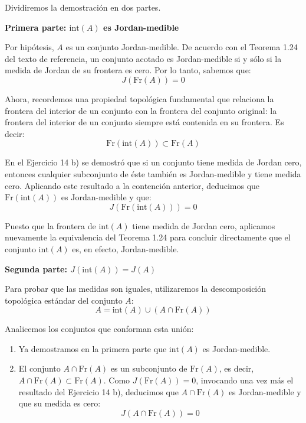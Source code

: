 \documentclass[11pt,letterpaper]{article}
\begin{document}
Dividiremos la demostración en dos partes.

\vspace{0.5cm}
\textbf{Primera parte: $\text{int}(A)$ es Jordan-medible}

Por hipótesis, $A$ es un conjunto Jordan-medible. De acuerdo con el Teorema 1.24 del texto de referencia, un conjunto acotado es Jordan-medible si y sólo si la medida de Jordan de su frontera es cero. Por lo tanto, sabemos que:
\begin{equation*}
J(\text{Fr}(A)) = 0
\end{equation*}

Ahora, recordemos una propiedad topológica fundamental que relaciona la frontera del interior de un conjunto con la frontera del conjunto original: la frontera del interior de un conjunto siempre está contenida en su frontera. Es decir:
\begin{equation*}
\text{Fr}(\text{int}(A)) \subset \text{Fr}(A)
\end{equation*}

En el Ejercicio 14 b) se demostró que si un conjunto tiene medida de Jordan cero, entonces cualquier subconjunto de éste también es Jordan-medible y tiene medida cero. Aplicando este resultado a la contención anterior, deducimos que $\text{Fr}(\text{int}(A))$ es Jordan-medible y que:
\begin{equation*}
J(\text{Fr}(\text{int}(A))) = 0
\end{equation*}

Puesto que la frontera de $\text{int}(A)$ tiene medida de Jordan cero, aplicamos nuevamente la equivalencia del Teorema 1.24 para concluir directamente que el conjunto $\text{int}(A)$ es, en efecto, Jordan-medible.

\vspace{0.5cm}
\textbf{Segunda parte: $J(\text{int}(A)) = J(A)$}

Para probar que las medidas son iguales, utilizaremos la descomposición topológica estándar del conjunto $A$:
\begin{equation*}
A = \text{int}(A) \cup (A \cap \text{Fr}(A))
\end{equation*}

Analicemos los conjuntos que conforman esta unión:
\begin{enumerate}
    \item Ya demostramos en la primera parte que $\text{int}(A)$ es Jordan-medible.
    \item El conjunto $A \cap \text{Fr}(A)$ es un subconjunto de $\text{Fr}(A)$, es decir, $A \cap \text{Fr}(A) \subset \text{Fr}(A)$. Como $J(\text{Fr}(A)) = 0$, invocando una vez más el resultado del Ejercicio 14 b), deducimos que $A \cap \text{Fr}(A)$ es Jordan-medible y que su medida es cero:
    \begin{equation*}
    J(A \cap \text{Fr}(A)) = 0
    \end{equation*}
\end{enumerate}
\end{document}
